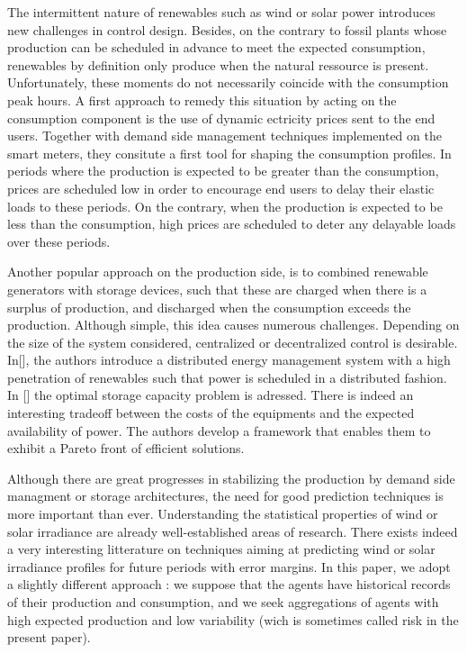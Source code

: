 \documentclass[conference]{IEEEtran}
\begin{document}
The intermittent nature of renewables such as wind or solar power introduces new challenges in control design. Besides, on the contrary to fossil plants whose production can be scheduled in advance to meet the expected consumption, renewables by definition only produce when the natural ressource is present. Unfortunately, these moments do not necessarily coincide with the consumption peak hours. A first approach to remedy this situation by acting on the consumption component is the use of dynamic ectricity prices sent to the end users. Together with demand side management techniques implemented on the smart meters, they consitute a first tool for shaping the consumption profiles. In periods where the production is expected to be greater than the consumption, prices are scheduled low in order to encourage end users to delay their elastic loads to these periods. On the contrary, when the production is expected to be less than the consumption, high prices are scheduled to deter any delayable loads over these periods.

Another popular approach on the production side, is to combined renewable generators with storage devices, such that these are charged when there is a surplus of production, and discharged when the consumption exceeds the production. Although simple, this idea causes numerous challenges. Depending on the size of the system considered, centralized or decentralized control is desirable. In[], the authors introduce a distributed energy management system with a high penetration of renewables such that power is scheduled in a distributed fashion. In [] the optimal storage capacity problem is adressed. There is indeed an interesting tradeoff between the costs of the equipments and the expected availability of power. The authors develop a framework that enables them to exhibit a Pareto front of efficient solutions.

Although there are great progresses in stabilizing the production by demand side managment or storage architectures, the need for good prediction techniques is more important than ever. Understanding the statistical properties of wind or solar irradiance are already well-established areas of research. There exists indeed a very interesting litterature on techniques aiming at predicting wind or solar irradiance profiles for future periods with error margins. In this paper, we adopt a slightly different approach : we suppose that the agents have historical records of their production and consumption, and we seek aggregations of agents with high expected production and low variability (wich is sometimes called risk in the present paper).
\end{document}
